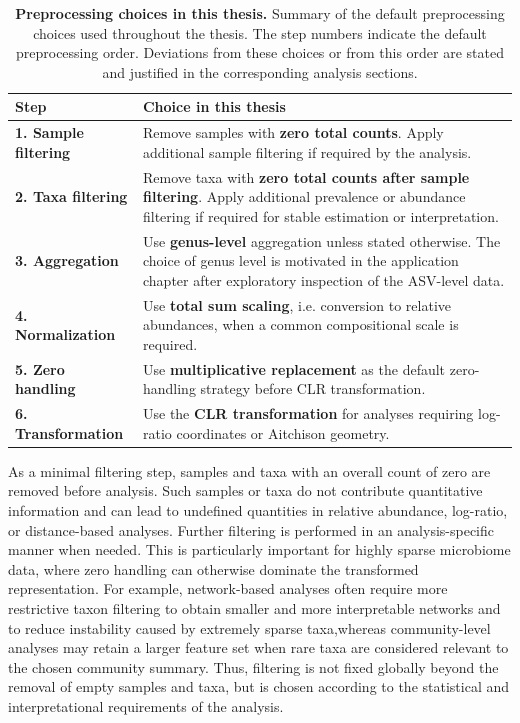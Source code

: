 \begin{table}[!ht]
\centering
\caption{\textbf{Preprocessing choices in this thesis.} Summary of the default preprocessing choices used throughout the thesis. The step numbers indicate the default preprocessing order. Deviations from these choices or from this order are stated and justified in the corresponding analysis sections.}
\label{tab:2micro:preprocessing_choices}
\vspace{0.5em}
\renewcommand{\arraystretch}{1.3}
\begin{tabular}{p{4cm}p{10.6cm}}
\toprule
\textbf{Step} & \textbf{Choice in this thesis} \\
\midrule
\textbf{1. Sample filtering} & Remove samples with \textbf{zero total counts}. Apply additional sample filtering if required by the analysis. \\
\textbf{2. Taxa filtering} & Remove taxa with \textbf{zero total counts after sample filtering}. Apply additional prevalence or abundance filtering if required for stable estimation or interpretation. \\
\textbf{3. Aggregation} & Use \textbf{genus-level} aggregation unless stated otherwise. The choice of genus level is motivated in the application chapter after exploratory inspection of the ASV-level data. \\
\textbf{4. Normalization} & Use \textbf{total sum scaling}, i.e. conversion to relative abundances, when a common compositional scale is required. \\
\textbf{5. Zero handling} & Use \textbf{multiplicative replacement} as the default zero-handling strategy before CLR transformation. \\
\textbf{6. Transformation} & Use the \textbf{CLR transformation} for analyses requiring log-ratio coordinates or Aitchison geometry. \\
\bottomrule
\end{tabular}
\end{table}

As a minimal filtering step, samples and taxa with an overall count of zero are removed before analysis. Such samples or taxa do not contribute quantitative information and can lead to undefined quantities in relative abundance, log-ratio, or distance-based analyses. Further filtering is performed in an analysis-specific manner when needed. This is particularly important for highly sparse microbiome data, where zero handling can otherwise dominate the transformed representation. For example, network-based analyses often require more restrictive taxon filtering to obtain smaller and more interpretable networks and to reduce instability caused by extremely sparse taxa,whereas community-level analyses may retain a larger feature set when rare taxa are considered relevant to the chosen community summary. Thus, filtering is not fixed globally beyond the removal of empty samples and taxa, but is chosen according to the statistical and interpretational requirements of the analysis.

